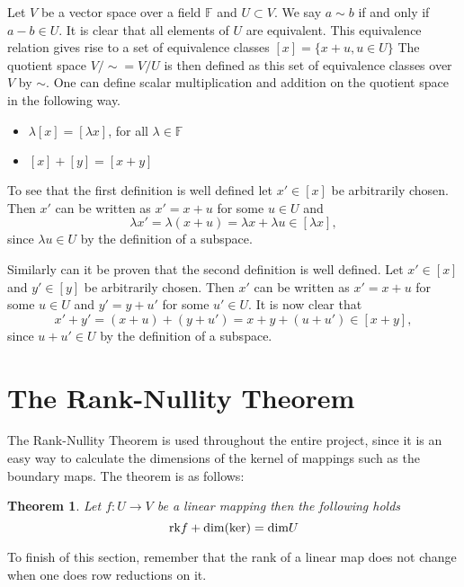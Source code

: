 \documentclass[11pt,a4paper,twoside]{report}
\newtheorem{mythm}{Theorem}[chapter]
\begin{document}
Let $V$ be a vector space over a field $\mathbb{F}$ and $U\subset V$. We say $a\sim b$ if and only if $a-b\in U$. It is clear that all elements of $U$ are equivalent.
This equivalence relation gives rise to a set of equivalence classes $[x]=\{x+u,u\in U\}$
The quotient space $V/\sim = V/U$ is then defined as this set of equivalence classes over $V$ by $\sim$.
One can define scalar multiplication and addition on the quotient space in the following way. \cite{wikiQuo}
\begin{itemize}
\item $\lambda[x]=[\lambda x]$, for all $\lambda\in\mathbb{F}$
\item $[x]+[y]=[x+y]$
\end{itemize}
To see that the first definition is well defined let $x'\in[x]$ be arbitrarily chosen. Then $x'$ can be written as $x'=x+u$ for some $u\in U$ and 
\begin{equation*}
\lambda x' = \lambda (x + u) = \lambda x + \lambda u \in [\lambda x],
\end{equation*}
since $\lambda u \in U$ by the definition of a subspace.

Similarly can it be proven that the second definition is well defined. Let $x'\in[x]$ and $y'\in [y]$ be arbitrarily chosen. Then $x'$ can be written as $x'=x+u$ for some $u\in U$ and $y' = y+u'$ for some $u'\in U$. It is now clear that
\begin{equation*}
x'+y'=(x+u)+(y+u')=x+y+(u+u')\in [x+y],
\end{equation*}
since $u+u'\in U$ by the definition of a subspace.


\section{The Rank-Nullity Theorem}
The Rank-Nullity Theorem is used throughout the entire project, since it is an easy way to calculate the dimensions of the kernel of mappings such as the boundary maps. The theorem is as follows\cite[p. 109]{LinAlg}: 
\begin{mythm}
Let $f:U\to V$ be a linear mapping then the following holds
\begin{equation*}
\textnormal{rk}f+\textnormal{dim}(\textnormal{ker})=\textnormal{dim}U
\end{equation*}
\end{mythm}

To finish of this section, remember that the rank of a linear map does not change when one does row reductions on it.
\end{document}
